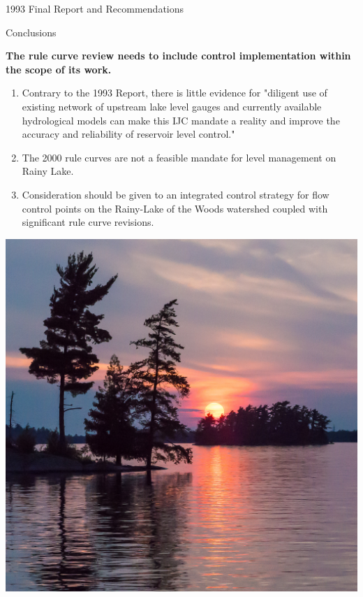 \documentclass[compress,english]{beamer}
\begin{document}
{{{{\begin{frame}{1993 Final Report and Recommendations}
\vspace*{3mm}

\end{frame}

\begin{frame}{Conclusions}

{\bf The rule curve review needs to include control implementation within the scope of its work.}

\begin{enumerate}

\item Contrary to the 1993 Report, there is little evidence for "diligent use of existing network of upstream lake level gauges and currently available hydrological models can make this IJC mandate a reality and improve the accuracy and reliability of reservoir level control."

\item The 2000 rule curves are not a feasible mandate for level management on Rainy Lake.

\item  Consideration should be given to an integrated control strategy for flow control points on the Rainy-Lake of the Woods watershed coupled with significant rule curve revisions.
	
\end{enumerate}

\end{frame}


{\usebackgroundtemplate%
	{\includegraphics[width=\paperwidth]{FloodedSunset}}
}}}}}
\end{document}
